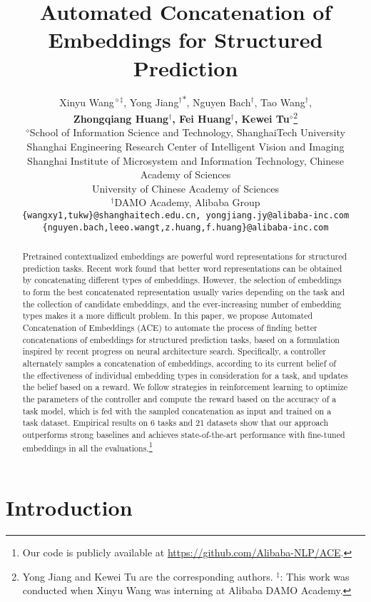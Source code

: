 \documentclass[11pt,a4paper]{article}
\title{Automated Concatenation of Embeddings for Structured Prediction}
\author{Xinyu Wang$^{\diamond\ddagger}$, Yong Jiang$^{\dagger}$\textsuperscript{$\ast$}, Nguyen Bach$^{\dagger}$, Tao Wang$^{\dagger}$,\\
\textbf{Zhongqiang Huang$^{\dagger}$, Fei Huang$^{\dagger}$,  Kewei Tu$^{\diamond}$}\thanks{\hspace{1mm} Yong Jiang and Kewei Tu are the corresponding authors. $^{\ddagger}$: This work was conducted when Xinyu Wang was interning at Alibaba DAMO Academy. } \\
 $^\diamond$School of Information Science and Technology, ShanghaiTech University \\
 Shanghai Engineering Research Center of Intelligent Vision and Imaging \\
  Shanghai Institute of Microsystem and Information Technology, Chinese Academy of Sciences \\
 University of Chinese Academy of Sciences \\
 $^\dagger$DAMO Academy, Alibaba Group \\
  {\tt \{wangxy1,tukw\}@shanghaitech.edu.cn, yongjiang.jy@alibaba-inc.com} \\
  {\tt \{nguyen.bach,leeo.wangt,z.huang,f.huang\}@alibaba-inc.com} \\
}
\date{}
\begin{document}
\maketitle

\begin{abstract}
Pretrained contextualized embeddings are powerful word representations for structured prediction tasks. Recent work found that better word representations can be obtained by concatenating different types of embeddings. However, the selection of embeddings to form the best concatenated representation usually varies depending on the task and the collection of candidate embeddings, and the ever-increasing number of embedding types makes it a more difficult problem. In this paper, we propose Automated Concatenation of Embeddings (ACE) to automate the process of finding better concatenations of embeddings for structured prediction tasks, based on a formulation inspired by recent progress on neural architecture search. Specifically, a controller alternately samples a concatenation of embeddings, according to its current belief of the effectiveness of individual embedding types in consideration for a task, and updates the belief based on a reward. We follow strategies in reinforcement learning to optimize the parameters of the controller and compute the reward based on the accuracy of a task model, which is fed with the sampled concatenation as input and trained on a task dataset. Empirical results on 6 tasks and 21 datasets show that our approach outperforms strong baselines and achieves state-of-the-art performance with fine-tuned embeddings in all the evaluations.\footnote{Our code is publicly available at \url{https://github.com/Alibaba-NLP/ACE}.}




\end{abstract}

\section{Introduction}
\end{document}
